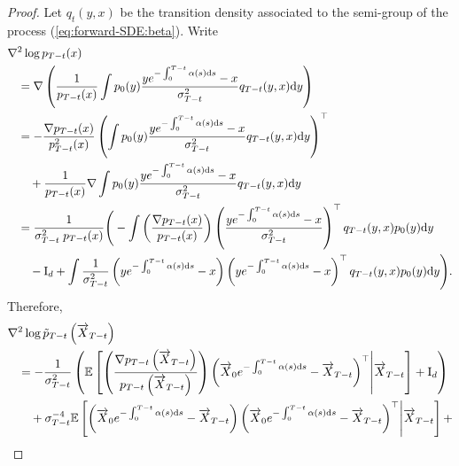 \documentclass[english,graybox,envcountchap,envcountsame,sectrefs,shortlabels]{svmono}
\theoremstyle{style}
\newcommand{\eqsp}{}
\begin{document}
\begin{proof}
Let $q_t(y,x) $ be the transition density associated to the semi-group of the process (\ref{eq:forward-SDE:beta}). Write 
\begin{align*}
    &\nabla^2 \log p_{T-t} (x)\\
    & \hspace{.3cm}=
    \nabla \left( \frac{1}{p_{T-t}(x)} \int p_0(y) \frac{y e^{- \int_0^{T-t} \alpha (s) \rmd s} - x }{\sigma^2_{T-t}}q_{T-t}(y,x) \rmd y \right) 
    \\
    & \hspace{.3cm}= -  \frac{\nabla p_{T-t} (x)}{p_{T-t}^2(x)} \left( \int p_0(y) \frac{y e^{- \int_0^{T-t} \alpha (s) \rmd s} - x }{\sigma^2_{T-t}} q_{T-t}(y,x)\rmd y \right)^\top
    \\
    &\hspace{.3cm}\quad
    +
    \frac{1}{p_{T-t}(x)} \nabla\int p_0(y) \frac{y e^{- \int_0^{T-t} \alpha (s) \rmd s} - x }{\sigma^2_{T-t}}
    q_{T-t}(y,x) \rmd y \\
    & \hspace{.3cm}= \frac{1}{\sigma^2_{T-t}\;p_{T-t}(x)}
    \Bigg(- \int \left( \frac{\nabla p_{T-t} (x)}{p_{T-t}(x)} \right) \left(  \frac{y e^{- \int_0^{T-t} \alpha (s) \rmd s} - x }{\sigma^2_{T-t}} \right)^\top 
    q_{T-t}(y,x) p_0(y) \rmd y
    \\
    &\hspace{.3cm}\quad 
    - \mathrm{I}_d + 
    \int \frac{1}{\sigma^2_{T-t}}\left(  y e^{- \int_0^{T-t} \alpha (s) \rmd s} - x  \right)
    \left(  
    y e^{- \int_0^{T-t} \alpha (s) \rmd s} - x  \right)^\top 
    q_{T-t}(y,x) p_0(y) \rmd y
    \Bigg)
    \eqsp.
\end{align*}
Therefore, 
\begin{align*}
     &\nabla^2 \log \tilde p_{T-t} \left( \ora X_{T-t} \right)\\ 
     & \hspace{.3cm}=
     - \frac{1}{\sigma_{T-t}^{2}}\left(  \mathbb{E} \left[ \left( \frac{\nabla p_{T-t} \left( \ora X_{T-t} \right)}{p_{T-t} \left( \ora X_{T-t} \right)} \right) \left(  \ora X_0 e^{- \int_0^{T-t} \alpha (s) \rmd s} - \ora X_{T-t} \right)^\top
     \middle| \ora X_{T-t}   \right] + \mathrm{I}_d\right)
     \\
    & \hspace{.3cm}\quad 
    + \sigma_{T-t}^{-4}  \mathbb{E} \left[ \left(\ora X_0 e^{- \int_0^{T-t} \alpha (s) \rmd s} - \ora X_{T-t} \right) \left(\ora X_0 e^{- \int_0^{T-t} \alpha (s) \rmd s} - \ora X_{T-t} \right)^\top \middle| \ora X_{T-t} \right] +

\end{align*}
\end{proof}
\end{document}
